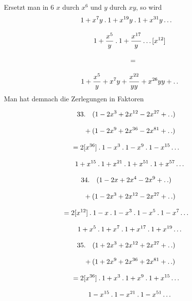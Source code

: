 \begingroup
\renewcommand{\arraystretch}{1.45}

Ersetzt man in 6 $x$ durch $x^{6}$ und $y$ durch $xy$, so wird
\[
\begin{gathered}
1+x^{7}y\mathbin{.}1+x^{19}y\mathbin{.}1+x^{31}y\mathinner{.\,.\,.}\\[8pt]\quad{}1+\frac{x^{5}}{y}\mathbin{.}1+\frac{x^{17}}{y}\mathinner{.\,.\,.}[x^{12}]\\[8pt]
\qquad=\\[8pt]\quad{}1+\frac{x^{5}}{y}+x^{7}y+\frac{x^{22}}{yy}+x^{26}yy+\mathinner{.\,.}
\end{gathered}
\]
Man hat demnach die Zerlegungen in Faktoren

\[
\begin{gathered}
33.\quad (1-2x^{3}+2x^{12}-2x^{27}+\mathinner{.\,.})\\[8pt]\quad{}+(1-2x^{9}+2x^{36}-2x^{81}+\mathinner{.\,.})\\[8pt]
 =2[x^{36}]\mathbin{.}1-x^{3}\mathbin{.}1-x^{9}\mathbin{.}1-x^{15}\mathinner{.\,.\,.}\\[8pt]\quad{}
 1+x^{15}\mathbin{.}1+x^{21}\mathbin{.}1+x^{51}\mathbin{.}1+x^{57}\mathinner{.\,.\,.}
\end{gathered}
\]

\[
\begin{gathered}
34.\quad (1-2x+2x^{4}-2x^{9}+\mathinner{.\,.})\\[8pt]\quad{}+(1-2x^{3}+2x^{12}-2x^{27}+\mathinner{.\,.})\\[8pt]
 =2[x^{12}]\mathbin{.}1-x\mathbin{.}1-x^{3}\mathbin{.}1-x^{5}\mathbin{.}1-x^{7}\mathinner{.\,.\,.}\\[8pt]\quad{}
 1+x^{5}\mathbin{.}1+x^{7}\mathbin{.}1+x^{17}\mathbin{.}1+x^{19}\mathinner{.\,.\,.}
\end{gathered}
\]

\[
\begin{gathered}
35.\quad (1+2x^{3}+2x^{12}+2x^{27}+\mathinner{.\,.})\\[8pt]\quad{}+(1+2x^{9}+2x^{36}+2x^{81}+\mathinner{.\,.})\\[8pt]
 =2[x^{36}]\mathbin{.}1+x^{3}\mathbin{.}1+x^{9}\mathbin{.}1+x^{15}\mathinner{.\,.\,.}\\[8pt]\quad{}
 1-x^{15}\mathbin{.}1-x^{21}\mathbin{.}1-x^{51}\mathinner{.\,.\,.}
\end{gathered}
\]

